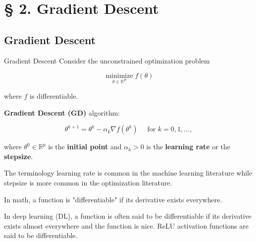 \section{§ 2. Gradient Descent}

\subsection{Gradient Descent}

\begin{frame}[allowframebreaks]

\begin{mydefinitionblock}{2.1}{Gradient Descent}
    Consider the unconstrained optimization problem

    $$
    \underset{\theta \in \mathbb{R}^{P}}{\operatorname{minimize}} f(\theta)
    $$

    where $f$ is differentiable.

    \textbf{Gradient Descent (GD)} algorithm:

    $$
    \theta^{k+1}=\theta^{k}-\alpha_{k} \nabla f\left(\theta^{k}\right) \quad \text { for } k=0,1, \ldots,
    $$

    where $\theta^{0} \in \mathbb{R}^{p}$ is the \textbf{initial point} and $\alpha_{k}>0$ is the \textbf{learning rate} or the \textbf{stepsize}.

    The terminology learning rate is common in the machine learning literature while stepsize is more common in the optimization literature.
\end{mydefinitionblock}

\end{frame}


\begin{frame}[allowframebreaks]

In math, a function is "differentiable" if its derivative exists everywhere.

In deep learning (DL), a function is often said to be differentiable if its derivative exists almost everywhere and the function is nice.
ReLU activation functions are said to be differentiable.

\end{frame}

